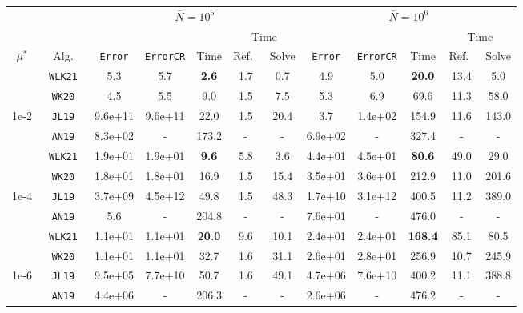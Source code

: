 \begin{tabular}{ccccccc|ccccc}%
\toprule
& & \multicolumn{5}{c}{$\bar N = 10^5$} & \multicolumn{5}{c}{$\bar N = 10^6$} \\
\cmidrule(lr){3-7} \cmidrule(lr){8-12}
& & & & & \multicolumn{2}{c}{Time} & & & & \multicolumn{2}{c}{Time} \\
\cmidrule(lr){6-7} \cmidrule(lr){11-12}
$\bar\mu^*$   & Alg.        & \texttt{Error} & \texttt{ErrorCR} & Time      & Ref.\ & Solve & \texttt{Error} & \texttt{ErrorCR} & Time     & Ref.\  & Solve \\
\midrule
& \texttt{ WLK21 }&  5.3&  5.7& \textbf{ 2.6 }&  1.7&  0.7&  4.9&  5.0& \textbf{ 20.0 }&  13.4&  5.0 \\
& \texttt{ WK20 }&  4.5&  5.5&  9.0&  1.5&  7.5&  5.3&  6.9&  69.6&  11.3&  58.0 \\
1e-2& \texttt{ JL19 }&  9.6e+11&  9.6e+11&  22.0&  1.5&  20.4&  3.7&  1.4e+02&  154.9&  11.6&  143.0 \\
& \texttt{ AN19 }&  8.3e+02& -&  173.2& -& -&  6.9e+02& -&  327.4& -& - \\
\midrule
& \texttt{ WLK21 }&  1.9e+01&  1.9e+01& \textbf{ 9.6 }&  5.8&  3.6&  4.4e+01&  4.5e+01& \textbf{ 80.6 }&  49.0&  29.0 \\
& \texttt{ WK20 }&  1.8e+01&  1.8e+01&  16.9&  1.5&  15.4&  3.5e+01&  3.6e+01&  212.9&  11.0&  201.6 \\
1e-4& \texttt{ JL19 }&  3.7e+09&  4.5e+12&  49.8&  1.5&  48.3&  1.7e+10&  3.1e+12&  400.5&  11.2&  389.0 \\
& \texttt{ AN19 }&  5.6& -&  204.8& -& -&  7.6e+01& -&  476.0& -& - \\
\midrule
& \texttt{ WLK21 }&  1.1e+01&  1.1e+01& \textbf{ 20.0 }&  9.6&  10.1&  2.4e+01&  2.4e+01& \textbf{ 168.4 }&  85.1&  80.5 \\
& \texttt{ WK20 }&  1.1e+01&  1.1e+01&  32.7&  1.6&  31.1&  2.6e+01&  2.8e+01&  256.9&  10.7&  245.9 \\
1e-6& \texttt{ JL19 }&  9.5e+05&  7.7e+10&  50.7&  1.6&  49.1&  4.7e+06&  7.6e+10&  400.2&  11.1&  388.8 \\
& \texttt{ AN19 }&  4.4e+06& -&  206.3& -& -&  2.6e+06& -&  476.2& -& - \\
\bottomrule
\end{tabular}

